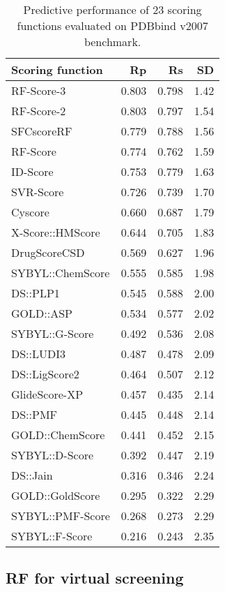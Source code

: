\documentclass{llncs}
\begin{document}
\begin{table}
\caption{Predictive performance of 23 scoring functions evaluated on PDBbind v2007 benchmark.}
\label{trn1105tst195}
\begin{tabular}{lrrr}
\hline
Scoring function & Rp & Rs & SD\\
\hline
RF-Score-3       & 0.803 & 0.798 & 1.42\\
RF-Score-2       & 0.803 & 0.797 & 1.54\\
SFCscoreRF       & 0.779 & 0.788 & 1.56\\
RF-Score         & 0.774 & 0.762 & 1.59\\
ID-Score         & 0.753 & 0.779 & 1.63\\
SVR-Score        & 0.726 & 0.739 & 1.70\\
Cyscore          & 0.660 & 0.687 & 1.79\\
X-Score::HMScore & 0.644 & 0.705 & 1.83\\
DrugScoreCSD     & 0.569 & 0.627 & 1.96\\
SYBYL::ChemScore & 0.555 & 0.585 & 1.98\\
DS::PLP1         & 0.545 & 0.588 & 2.00\\
GOLD::ASP        & 0.534 & 0.577 & 2.02\\
SYBYL::G-Score   & 0.492 & 0.536 & 2.08\\
DS::LUDI3        & 0.487 & 0.478 & 2.09\\
DS::LigScore2    & 0.464 & 0.507 & 2.12\\
GlideScore-XP    & 0.457 & 0.435 & 2.14\\
DS::PMF          & 0.445 & 0.448 & 2.14\\
GOLD::ChemScore  & 0.441 & 0.452 & 2.15\\
SYBYL::D-Score   & 0.392 & 0.447 & 2.19\\
DS::Jain         & 0.316 & 0.346 & 2.24\\
GOLD::GoldScore  & 0.295 & 0.322 & 2.29\\
SYBYL::PMF-Score & 0.268 & 0.273 & 2.29\\
SYBYL::F-Score   & 0.216 & 0.243 & 2.35\\
\hline
\end{tabular}
\end{table}


\subsection{RF for virtual screening}
\end{document}

